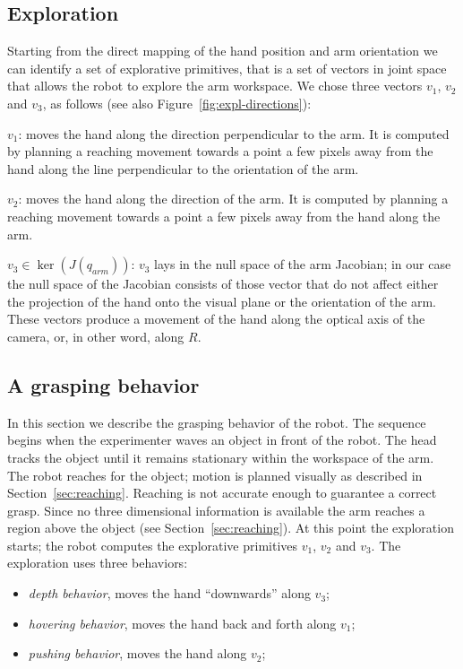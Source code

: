 \subsection{Exploration}
Starting from the direct mapping of the hand position and arm orientation we
can identify a set of explorative primitives, that is a set of vectors in
joint space that allows the robot to explore the arm workspace. We chose three
vectors $v_1$, $v_2$ and $v_3$, as follows (see also 
Figure~\ref{fig:expl-directions}):

$v_1$: moves the hand along the
direction perpendicular to the arm. It is computed by planning a 
reaching movement towards a point a few pixels away from the hand along the
line perpendicular to the orientation of the arm.

$v_2$: moves the hand along the
direction of the arm. It is computed by planning a 
reaching movement towards a point a few pixels away from the hand along the 
arm.

$v_3\in \ker \left(J\left(q_{arm}\right)\right)$: $v_3$ lays in the null 
space of the arm Jacobian; in our case the null space of the Jacobian 
consists of those vector that do not affect
either the projection of the hand onto the visual plane or the orientation
of the arm. These vectors produce a movement of the hand along the optical
axis of the camera, or, in other word, along $R$.
%
\subsection{A grasping behavior}
In this section we describe the grasping behavior of the robot.
The sequence begins when the experimenter waves an object in front
of the robot. The head tracks the object until it remains
stationary within the workspace of the arm. The robot reaches for
the object; motion is planned visually as described in
Section~\ref{sec:reaching}. Reaching is not accurate enough to
guarantee a correct grasp. Since no three dimensional information
is available the arm reaches a region above the object (see
Section~\ref{sec:reaching}). At this point the exploration starts;
the robot computes the explorative primitives $v_1$, $v_2$ and
$v_3$. The exploration uses three behaviors: 
%
\begin{itemize}
%
\item \emph{depth behavior}, moves the hand ``downwards''
along $v_3$; 
%
\item \emph{hovering behavior}, moves the hand back and forth along 
$v_1$;
%
\item \emph{pushing behavior}, moves the hand along $v_2$;
%
\end{itemize}

